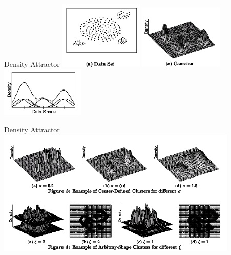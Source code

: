 \begin{frame}{Density Attractor}
	\centering
	\vspace{1cm}
	\includegraphics[width=4cm]{img/densityattractor.png}
	\includegraphics[width=4cm]{img/densityattractor1.png}
	\includegraphics[width=4cm]{img/densityattractor2.png}
\end{frame}

\begin{frame}{Density Attractor}
	\centering
	\includegraphics[width=11.5cm]{img/densities.png}
\end{frame}
